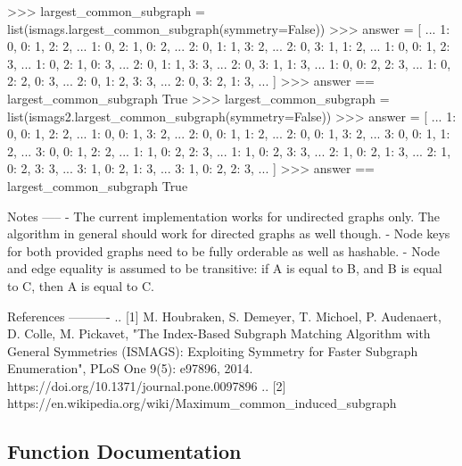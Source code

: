 \begin{DoxyVerb}
>>> largest_common_subgraph = list(ismags.largest_common_subgraph(symmetry=False))
>>> answer = [
...     {1: 0, 0: 1, 2: 2},
...     {1: 0, 2: 1, 0: 2},
...     {2: 0, 1: 1, 3: 2},
...     {2: 0, 3: 1, 1: 2},
...     {1: 0, 0: 1, 2: 3},
...     {1: 0, 2: 1, 0: 3},
...     {2: 0, 1: 1, 3: 3},
...     {2: 0, 3: 1, 1: 3},
...     {1: 0, 0: 2, 2: 3},
...     {1: 0, 2: 2, 0: 3},
...     {2: 0, 1: 2, 3: 3},
...     {2: 0, 3: 2, 1: 3},
... ]
>>> answer == largest_common_subgraph
True
>>> largest_common_subgraph = list(ismags2.largest_common_subgraph(symmetry=False))
>>> answer = [
...     {1: 0, 0: 1, 2: 2},
...     {1: 0, 0: 1, 3: 2},
...     {2: 0, 0: 1, 1: 2},
...     {2: 0, 0: 1, 3: 2},
...     {3: 0, 0: 1, 1: 2},
...     {3: 0, 0: 1, 2: 2},
...     {1: 1, 0: 2, 2: 3},
...     {1: 1, 0: 2, 3: 3},
...     {2: 1, 0: 2, 1: 3},
...     {2: 1, 0: 2, 3: 3},
...     {3: 1, 0: 2, 1: 3},
...     {3: 1, 0: 2, 2: 3},
... ]
>>> answer == largest_common_subgraph
True

Notes
-----
 - The current implementation works for undirected graphs only. The algorithm
   in general should work for directed graphs as well though.
 - Node keys for both provided graphs need to be fully orderable as well as
   hashable.
 - Node and edge equality is assumed to be transitive: if A is equal to B, and
   B is equal to C, then A is equal to C.

References
----------
.. [1] M. Houbraken, S. Demeyer, T. Michoel, P. Audenaert, D. Colle,
   M. Pickavet, "The Index-Based Subgraph Matching Algorithm with General
   Symmetries (ISMAGS): Exploiting Symmetry for Faster Subgraph
   Enumeration", PLoS One 9(5): e97896, 2014.
   https://doi.org/10.1371/journal.pone.0097896
.. [2] https://en.wikipedia.org/wiki/Maximum_common_induced_subgraph
\end{DoxyVerb}
 

\subsection{Function Documentation}
\mbox{\label{namespacenetworkx_1_1algorithms_1_1isomorphism_1_1ismags_adeaeb2412166ed583ba1f5911656cd5e}} 
